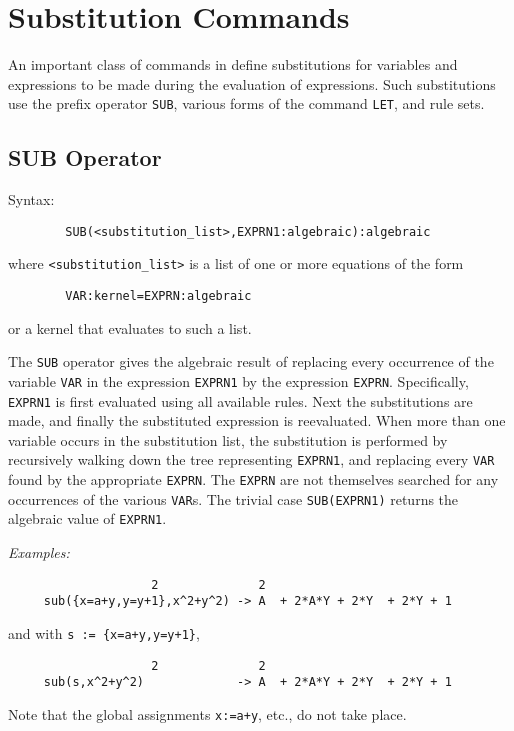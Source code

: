 \chapter{Substitution Commands}
An important class of commands in {\REDUCE} define
substitutions for variables and expressions to be made during the
evaluation of expressions.  Such substitutions use the prefix operator
{\tt SUB}, various forms of the command {\tt LET}, and rule sets.

\section{SUB Operator}

Syntax:
\begin{verbatim}
        SUB(<substitution_list>,EXPRN1:algebraic):algebraic
\end{verbatim}
where {\tt <substitution\_list>} is a list of one or more equations of the
form
\begin{verbatim}
        VAR:kernel=EXPRN:algebraic
\end{verbatim}
or a kernel that evaluates to such a list.

The {\tt SUB} operator gives the algebraic result of replacing every
occurrence of the variable {\tt VAR} in the expression {\tt EXPRN1} by the
expression {\tt EXPRN}.  Specifically, {\tt EXPRN1} is first evaluated
using all available rules.  Next the substitutions are made, and finally
the substituted expression is reevaluated.  When more than one variable
occurs in the substitution list, the substitution is performed by
recursively walking down the tree representing {\tt EXPRN1}, and replacing
every {\tt VAR} found by the appropriate {\tt EXPRN}.  The {\tt EXPRN} are
not themselves searched for any occurrences of the various {\tt VAR}s.
The trivial case {\tt SUB(EXPRN1)} returns the algebraic value of
{\tt EXPRN1}.

{\it Examples:}
\begin{verbatim}
				    2              2
     sub({x=a+y,y=y+1},x^2+y^2) -> A  + 2*A*Y + 2*Y  + 2*Y + 1
\end{verbatim}
and with {\tt s := \{x=a+y,y=y+1\}},
\begin{verbatim}
				    2              2
     sub(s,x^2+y^2)             -> A  + 2*A*Y + 2*Y  + 2*Y + 1
\end{verbatim}

Note that the global assignments {\tt x:=a+y}, etc., do not take place.

